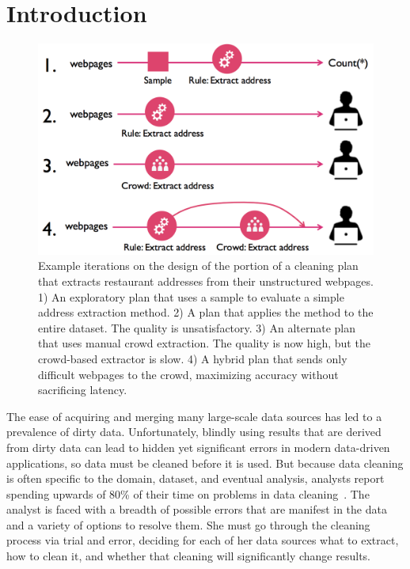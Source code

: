 \section{Introduction}\label{sec:intro}

\begin{figure}[t]
\centering
\vspace{-0.5cm}
\includegraphics[width = .4\textwidth]{figs/lifecycle.png}
\vspace{-0.4cm}
\caption{Example iterations on the design of the portion of a cleaning plan that extracts restaurant addresses from their unstructured webpages.  
1) An exploratory plan that uses a sample to evaluate a simple address extraction method.
2) A plan that applies the method to the entire dataset. The quality is unsatisfactory. 
3) An alternate plan that uses manual crowd extraction. The quality is now high, but the crowd-based extractor is slow. 
4) A hybrid plan that sends only difficult webpages to the crowd, maximizing accuracy without sacrificing latency.}
\label{fig:ex-plan}
\vspace{-0.6cm}
\end{figure}

%
%
The ease of acquiring and merging many large-scale data sources has led to a prevalence of dirty data.
Unfortunately, blindly using results that are derived from dirty data can lead to hidden yet significant errors in modern data-driven applications, so data must be cleaned before it is used.
But because data cleaning is often specific to the domain, dataset, and eventual analysis, analysts report spending upwards of 80\% of their time on problems in data cleaning~\cite{kandel2012}.
The analyst is faced with a breadth of possible errors that are manifest in the data and a variety of options to resolve them.
She must go through the cleaning process via trial and error, deciding for each of her data sources what to extract, how to clean it, and whether that cleaning will significantly change results.

